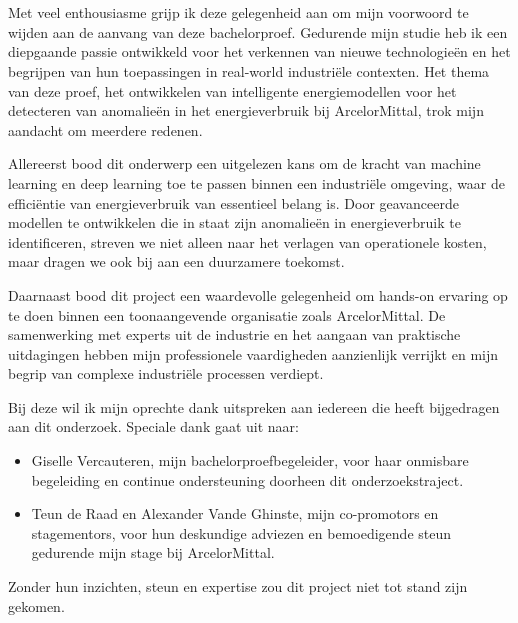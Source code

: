 
\chapter*{}%
\label{ch:voorwoord}



Met veel enthousiasme grijp ik deze gelegenheid aan om mijn voorwoord te wijden aan de aanvang van deze bachelorproef. Gedurende mijn studie heb ik een diepgaande passie ontwikkeld voor het verkennen van nieuwe technologieën en het begrijpen van hun toepassingen in real-world industriële contexten. Het thema van deze proef, het ontwikkelen van intelligente energiemodellen voor het detecteren van anomalieën in het energieverbruik bij ArcelorMittal, trok mijn aandacht om meerdere redenen.

Allereerst bood dit onderwerp een uitgelezen kans om de kracht van machine learning en deep learning toe te passen binnen een industriële omgeving, waar de efficiëntie van energieverbruik van essentieel belang is. Door geavanceerde modellen te ontwikkelen die in staat zijn anomalieën in energieverbruik te identificeren, streven we niet alleen naar het verlagen van operationele kosten, maar dragen we ook bij aan een duurzamere toekomst.

Daarnaast bood dit project een waardevolle gelegenheid om hands-on ervaring op te doen binnen een toonaangevende organisatie zoals ArcelorMittal. De samenwerking met experts uit de industrie en het aangaan van praktische uitdagingen hebben mijn professionele vaardigheden aanzienlijk verrijkt en mijn begrip van complexe industriële processen verdiept.

Bij deze wil ik mijn oprechte dank uitspreken aan iedereen die heeft bijgedragen aan dit onderzoek. Speciale dank gaat uit naar:
\begin{itemize}
    \item Giselle Vercauteren, mijn bachelorproefbegeleider, voor haar onmisbare begeleiding en continue ondersteuning doorheen dit onderzoekstraject.
    \item Teun de Raad en Alexander Vande Ghinste, mijn co-promotors en stagementors, voor hun deskundige adviezen en bemoedigende steun gedurende mijn stage bij ArcelorMittal.
\end{itemize}
Zonder hun inzichten, steun en expertise zou dit project niet tot stand zijn gekomen.

